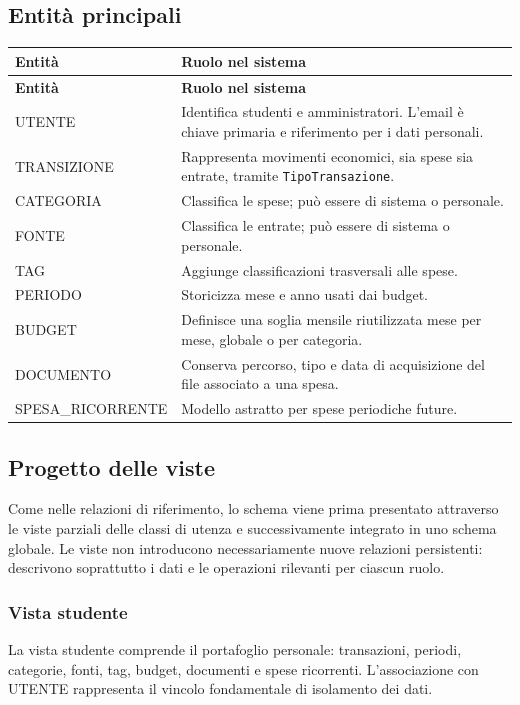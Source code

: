 \documentclass[11pt,a4paper]{article}
\begin{document}
\subsection{Entità principali}
\begin{longtable}{p{4.7cm} p{10.1cm}}
\toprule
\textbf{Entità} & \textbf{Ruolo nel sistema} \\
\midrule
\endfirsthead
\toprule
\textbf{Entità} & \textbf{Ruolo nel sistema} \\
\midrule
\endhead
\textsc{UTENTE} & Identifica studenti e amministratori. L'email è chiave primaria e riferimento per i dati personali. \\
\textsc{TRANSIZIONE} & Rappresenta movimenti economici, sia spese sia entrate, tramite \texttt{TipoTransazione}. \\
\textsc{CATEGORIA} & Classifica le spese; può essere di sistema o personale. \\
\textsc{FONTE} & Classifica le entrate; può essere di sistema o personale. \\
\textsc{TAG} & Aggiunge classificazioni trasversali alle spese. \\
\textsc{PERIODO} & Storicizza mese e anno usati dai budget. \\
\textsc{BUDGET} & Definisce una soglia mensile riutilizzata mese per mese, globale o per categoria. \\
\textsc{DOCUMENTO} & Conserva percorso, tipo e data di acquisizione del file associato a una spesa. \\
\textsc{SPESA\_RICORRENTE} & Modello astratto per spese periodiche future. \\
\bottomrule
\end{longtable}

\subsection{Progetto delle viste}
Come nelle relazioni di riferimento, lo schema viene prima presentato attraverso le viste parziali delle classi di utenza e successivamente integrato in uno schema globale. Le viste non introducono necessariamente nuove relazioni persistenti: descrivono soprattutto i dati e le operazioni rilevanti per ciascun ruolo.

\subsubsection{Vista studente}
La vista studente comprende il portafoglio personale: transazioni, periodi, categorie, fonti, tag, budget, documenti e spese ricorrenti. L'associazione con \textsc{UTENTE} rappresenta il vincolo fondamentale di isolamento dei dati.
\end{document}
